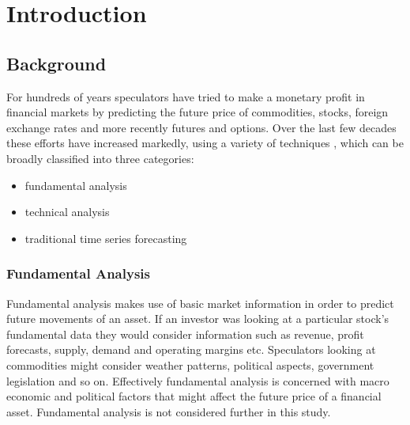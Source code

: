 
\chapter{Introduction} %

\label{Chapter1} %



\section{Background}
For hundreds of years speculators have tried to make a monetary profit in financial markets by predicting the future price of commodities, stocks, foreign exchange rates and more recently futures and options. Over the last few decades these efforts have increased markedly, using a variety of techniques \citep{Hsu201114026}, which can be broadly classified into three categories:

\begin{itemize}
\item fundamental analysis
\item technical analysis
\item traditional time series forecasting
\end{itemize}

\subsection{Fundamental Analysis}
Fundamental analysis makes use of basic market information in order to predict future movements of an asset. If an investor was looking at a particular stock's fundamental data they would consider information such as revenue, profit forecasts, supply, demand and operating margins etc. Speculators looking at commodities might consider weather patterns, political aspects, government legislation and so on. Effectively fundamental analysis is concerned with macro economic and political factors that might affect the future price of a financial asset. Fundamental analysis is not considered further in this study.


